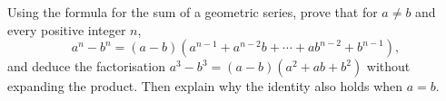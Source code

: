 Using the formula for the sum of a geometric series, prove that for $a\ne b$ and every positive integer $n$,
\[
a^n-b^n=(a-b)\left(a^{n-1}+a^{n-2}b+\cdots+ab^{n-2}+b^{n-1}\right),
\]
and deduce the factorisation $a^3-b^3=(a-b)(a^2+ab+b^2)$ without expanding the product. Then explain why the identity also holds when $a=b$.
